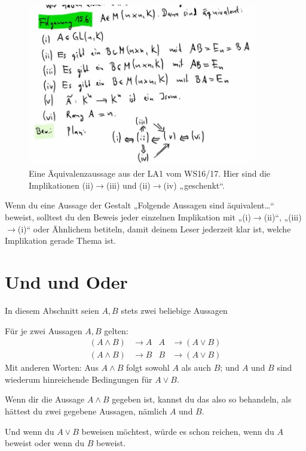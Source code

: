 \begin{bem}
\begin{figure}[ht]
        \includegraphics[width=10cm]{./_img/equivbeweis.jpeg}
        \centering \caption{Eine Äquivalenzaussage aus der LA1 vom WS16/17. Hier sind die Implikationen (ii)$\to$(iii) und (ii)$\to$(iv) „geschenkt“.}
    \end{figure}
\end{bem}


\begin{bem}[Signalwörter]
    Wenn du eine Aussage der Gestalt „Folgende Aussagen sind äquivalent\dots“ beweist, solltest du den Beweis jeder einzelnen Implikation mit „(i)$\to$(ii)“, „(iii)$\to$(i)“ oder Ähnlichem betiteln, damit deinem Leser jederzeit klar ist, welche Implikation gerade Thema ist.
\end{bem}





\section{Und und Oder}


In diesem Abschnitt seien $A,B$ stets zwei beliebige Aussagen


\begin{axiom}[*]\label{undoderaxiome}
    Für je zwei Aussagen $A,B$ gelten:
    \begin{align*}
        (A\land B) & \to A & A & \to (A\lor B) \\
        (A\land B) & \to B & B & \to (A\lor B)
    \end{align*}
    Mit anderen Worten: Aus $A\land B$ folgt sowohl $A$ als auch $B$; und $A$ und $B$ sind wiederum hinreichende Bedingungen für $A\lor B$.
\end{axiom}


\begin{bem}
    Wenn dir die Aussage $A\land B$ gegeben ist, kannst du das also so behandeln, als hättest du zwei gegebene Aussagen, nämlich $A$ und $B$.
    
    Und wenn du $A\lor B$ beweisen möchtest, würde es schon reichen, wenn du $A$ beweist oder wenn du $B$ beweist.
\end{bem}



